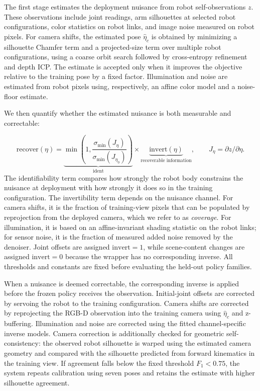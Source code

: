 \documentclass{article}
\newcommand{\ident}{\mathrm{ident}}
\newcommand{\invert}{\mathrm{invert}}
\newcommand{\recover}{\mathrm{recover}}
\begin{document}
The first stage estimates the deployment nuisance from robot self-observations $z$. These observations include joint
readings, arm silhouettes at selected robot configurations, color statistics on robot links, and image noise measured on
robot pixels. For camera shifts, the estimated pose $\hat\eta_c$ is obtained by minimizing a silhouette Chamfer term and
a projected-size term over multiple robot configurations, using a coarse orbit search followed by cross-entropy
refinement and depth ICP. The estimate is accepted only when it improves the objective relative to the training pose by
a fixed factor. Illumination and noise are estimated from robot pixels using, respectively, an affine color model and a
noise-floor estimate.

We then quantify whether the estimated nuisance is both measurable and correctable:

\[
\recover(\eta)=
\underbrace{\min\!\left(1,\frac{\sigma_{\min}(J_\eta)}
{\sigma_{\min}(J_{\eta_0})}\right)}_{\ident}
\times
\underbrace{\invert(\eta)}_{\text{recoverable information}},\qquad
J_\eta=\partial z/\partial\eta .
\]
The identifiability term compares how strongly the robot body constrains the nuisance at deployment with how strongly it
does so in the training configuration. The invertibility term depends on the nuisance channel. For camera shifts, it is
the fraction of training-view pixels that can be populated by reprojection from the deployed camera, which we refer to
as \emph{coverage}. For illumination, it is based on an affine-invariant shading statistic on the robot links; for
sensor noise, it is the fraction of measured added noise removed by the denoiser. Joint offsets are assigned
$\invert=1$, while scene-content changes are assigned $\invert=0$ because the wrapper has no corresponding inverse.
All thresholds and constants are fixed before evaluating the held-out policy families.

When a nuisance is deemed correctable, the corresponding inverse is applied before the frozen policy receives the
observation. Initial-joint offsets are corrected by servoing the robot to the training configuration. Camera shifts are
corrected by reprojecting the RGB-D observation into the training camera using $\hat\eta_c$ and z-buffering.
Illumination and noise are corrected using the fitted channel-specific inverse models. Camera correction is additionally
checked for geometric self-consistency: the observed robot silhouette is warped using the estimated camera geometry and
compared with the silhouette predicted from forward kinematics in the training view. If agreement falls below the fixed
threshold $F_1<0.75$, the system repeats calibration using seven poses and retains the estimate with higher silhouette
agreement.
\end{document}
